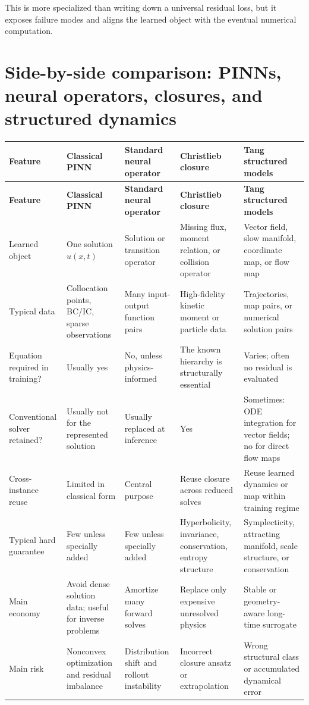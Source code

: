 \documentclass[11pt]{article}
\begin{document}
This is more specialized than writing down a universal residual loss, but it exposes failure modes and aligns the learned object with the eventual numerical computation.

\section{Side-by-side comparison: PINNs, neural operators, closures, and structured dynamics}

\begin{longtable}{@{}P{0.13\textwidth}P{0.175\textwidth}P{0.185\textwidth}P{0.18\textwidth}P{0.22\textwidth}@{}}
\toprule
\textbf{Feature} & \textbf{Classical PINN} & \textbf{Standard neural operator} & \textbf{Christlieb closure} & \textbf{Tang structured models} \\
\midrule
\endfirsthead
\toprule
\textbf{Feature} & \textbf{Classical PINN} & \textbf{Standard neural operator} & \textbf{Christlieb closure} & \textbf{Tang structured models} \\
\midrule
\endhead
Learned object & One solution \(u(x,t)\) & Solution or transition operator & Missing flux, moment relation, or collision operator & Vector field, slow manifold, coordinate map, or flow map \\
Typical data & Collocation points, BC/IC, sparse observations & Many input-output function pairs & High-fidelity kinetic moment or particle data & Trajectories, map pairs, or numerical solution pairs \\
Equation required in training? & Usually yes & No, unless physics-informed & The known hierarchy is structurally essential & Varies; often no residual is evaluated \\
Conventional solver retained? & Usually not for the represented solution & Usually replaced at inference & Yes & Sometimes: ODE integration for vector fields; no for direct flow maps \\
Cross-instance reuse & Limited in classical form & Central purpose & Reuse closure across reduced solves & Reuse learned dynamics or map within training regime \\
Typical hard guarantee & Few unless specially added & Few unless specially added & Hyperbolicity, invariance, conservation, entropy structure & Symplecticity, attracting manifold, scale structure, or conservation \\
Main economy & Avoid dense solution data; useful for inverse problems & Amortize many forward solves & Replace only expensive unresolved physics & Stable or geometry-aware long-time surrogate \\
Main risk & Nonconvex optimization and residual imbalance & Distribution shift and rollout instability & Incorrect closure ansatz or extrapolation & Wrong structural class or accumulated dynamical error \\
\bottomrule
\end{longtable}
\end{document}
